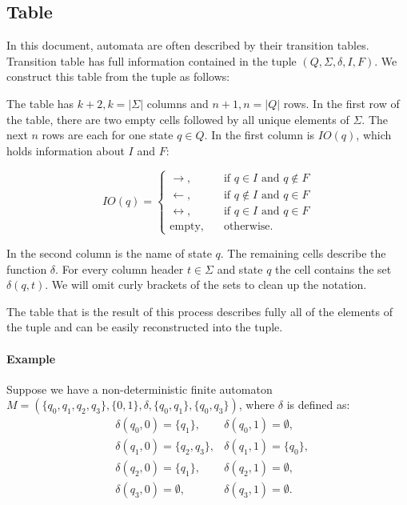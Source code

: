 \documentclass{ctuthesis}
\begin{document}
\subsection{Table}
In this document, automata are often described by their transition tables. Transition table has full information contained in the tuple $(Q, \Sigma, \delta, I, F)$. We construct this table from the tuple as follows:

The table has $k+2, k = |\Sigma|$ columns and $n+1, n = |Q|$ rows. In the first row of the table, there are two empty cells followed by all unique elements of $\Sigma$. The next $n$ rows are each for one state $q \in Q$. In the first column is $IO(q)$, which holds information about $I$ and $F$:

\begin{equation*}
	IO(q) = 
	\begin{cases}
		\rightarrow, & \quad \text{if } q \in I \text{ and } q \not \in F \\
		\leftarrow, & \quad \text{if } q \not \in I \text{ and } q \in F \\
		\leftrightarrow, & \quad \text{if } q \in I \text{ and } q \in F \\
		\text{empty}, & \quad \text{otherwise.}  
	\end{cases}
\end{equation*}


In the second column is the name of state $q$. The remaining cells describe the function $\delta$. For every column header $t \in \Sigma$ and state $q$ the cell contains the set $\delta(q, t)$. We will omit curly brackets of the sets to clean up the notation. 

The table that is the result of this process describes fully all of the elements of the tuple and can be easily reconstructed into the tuple.

\paragraph{Example}
Suppose we have a non-deterministic finite automaton $M = (\{q_0, q_1, q_2, q_3\}, \{0,1\}, \delta, \{q_0, q_1\}, \{q_0, q_3\})$, where $\delta$ is defined as:
\begin{align*}
	&\delta(q_0, 0) = \{q_1\}, &\delta(q_0, 1) = \emptyset, \\
	&\delta(q_1, 0) = \{q_2, q_3\}, &\delta(q_1, 1) = \{q_0\}, \\
	&\delta(q_2, 0) = \{q_1\}, &\delta(q_2, 1) = \emptyset, \\
	&\delta(q_3, 0) = \emptyset, &\delta(q_3, 1) = \emptyset. 
\end{align*}
\end{document}
